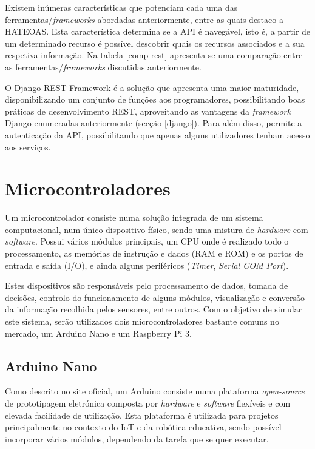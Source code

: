 Existem inúmeras características que potenciam cada uma das ferramentas/\textit{frameworks} abordadas anteriormente, entre as quais destaco a \ac{HATEOAS}. Esta característica determina se a API é  navegável, isto é, a partir de um determinado recurso é possível descobrir quais os recursos associados e a sua respetiva informação. Na tabela \ref{comp-rest} apresenta-se uma comparação entre as ferramentas/\textit{frameworks} discutidas anteriormente. 


O Django REST Framework é a solução que apresenta uma maior maturidade, disponibilizando um conjunto de funções aos programadores, possibilitando boas práticas de desenvolvimento \ac{REST}, aproveitando as vantagens da \textit{framework} Django enumeradas anteriormente (secção \ref{django}). Para além disso, permite a autenticação da API, possibilitando que apenas alguns utilizadores tenham acesso aos serviços. 










\section{Microcontroladores}


Um microcontrolador consiste numa solução integrada de um sistema computacional, num único dispositivo físico, sendo uma mistura de \textit{hardware} com \textit{software}. Possui vários módulos principais, um \ac{CPU} onde é realizado todo o processamento, as memórias de instrução e dados (\ac{RAM} e \ac{ROM}) e os portos de entrada e saída (\ac{I/O}), e ainda alguns periféricos (\textit{Timer}, \textit{Serial COM Port}). 

Estes dispositivos são responsáveis pelo processamento de dados, tomada de decisões, controlo do funcionamento de alguns módulos, visualização e conversão da informação recolhida pelos sensores, entre outros. Com o objetivo de simular este sistema, serão utilizados dois microcontroladores bastante comuns no mercado, um Arduino Nano e um Raspberry Pi 3.  


\subsection{Arduino Nano}


Como descrito no site oficial, um Arduino consiste numa plataforma \textit{open-source} de prototipagem eletrónica composta por \textit{hardware} e \textit{software} flexíveis e com elevada facilidade de utilização. Esta plataforma é utilizada para projetos principalmente no contexto do \ac{IoT} e da robótica educativa, sendo possível incorporar vários módulos, dependendo da tarefa que se quer executar\cite{Banzi2012}. 


